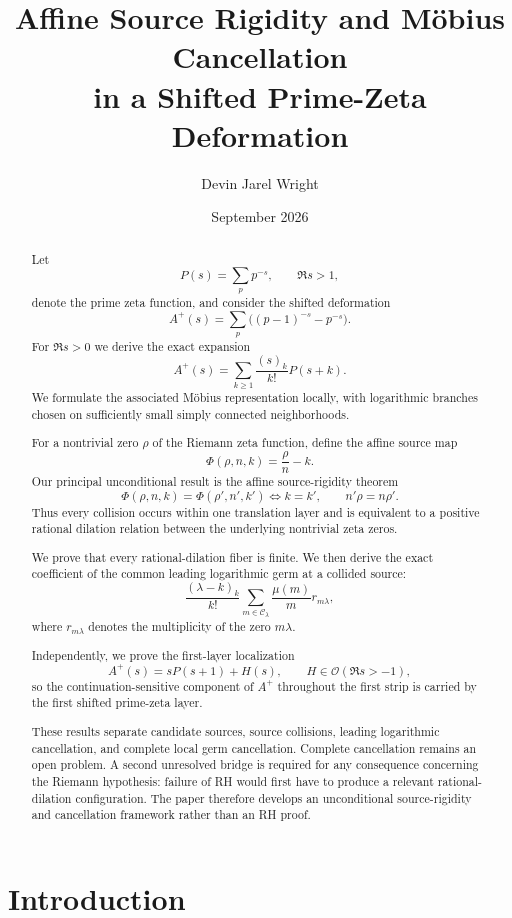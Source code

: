 \documentclass[11pt]{article}
\title{\textbf{Affine Source Rigidity and Möbius Cancellation\\
in a Shifted Prime-Zeta Deformation}}
\author{Devin Jarel Wright}
\date{September 2026}
\theoremstyle{definition}
\newcommand{\C}{\mathcal C}
\newcommand{\PhiA}{\Phi}
\newcommand{\muMob}{\mu}
\newcommand{\Ocal}{\mathcal O}
\begin{document}
\maketitle

\begin{abstract}
Let
\[
P(s)=\sum_p p^{-s},\qquad \Re s>1,
\]
denote the prime zeta function, and consider the shifted deformation
\[
A^+(s)=\sum_p\bigl((p-1)^{-s}-p^{-s}\bigr).
\]
For $\Re s>0$ we derive the exact expansion
\[
A^+(s)=\sum_{k\ge1}\frac{(s)_k}{k!}P(s+k).
\]
We formulate the associated Möbius representation locally, with logarithmic branches chosen on sufficiently small simply connected neighborhoods.

For a nontrivial zero $\rho$ of the Riemann zeta function, define the affine source map
\[
\PhiA(\rho,n,k)=\frac{\rho}{n}-k.
\]
Our principal unconditional result is the affine source-rigidity theorem
\[
\PhiA(\rho,n,k)=\PhiA(\rho',n',k')
\iff
k=k',\qquad n'\rho=n\rho'.
\]
Thus every collision occurs within one translation layer and is equivalent to a positive rational dilation relation between the underlying nontrivial zeta zeros.

We prove that every rational-dilation fiber is finite. We then derive the exact coefficient of the common leading logarithmic germ at a collided source:
\[
\frac{(\lambda-k)_k}{k!}
\sum_{m\in\C_\lambda}\frac{\muMob(m)}{m}r_{m\lambda},
\]
where $r_{m\lambda}$ denotes the multiplicity of the zero $m\lambda$.

Independently, we prove the first-layer localization
\[
A^+(s)=sP(s+1)+H(s),\qquad H\in\Ocal(\Re s>-1),
\]
so the continuation-sensitive component of $A^+$ throughout the first strip is carried by the first shifted prime-zeta layer.

These results separate candidate sources, source collisions, leading logarithmic cancellation, and complete local germ cancellation. Complete cancellation remains an open problem. A second unresolved bridge is required for any consequence concerning the Riemann hypothesis: failure of RH would first have to produce a relevant rational-dilation configuration. The paper therefore develops an unconditional source-rigidity and cancellation framework rather than an RH proof.
\end{abstract}

\section{Introduction}
\end{document}
